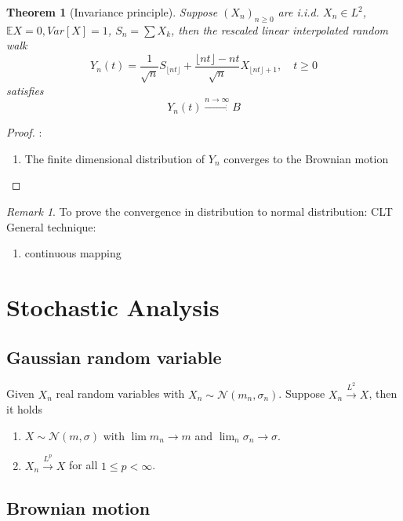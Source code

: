 \documentclass[a4paper,11pt]{book}
\newtheorem{theorem}{Theorem}[section]
\theoremstyle{definition}
\theoremstyle{remark}
\newtheorem*{remark}{Remark}
\begin{document}
\begin{theorem}[Invariance principle]
	Suppose $(X_n)_{n \geq 0}$ are i.i.d. $X_n \in L^2$, $\mathbb{E}X = 0, Var[X] = 1$, $S_n = \sum X_k$, then the rescaled linear interpolated random walk 
	\begin{equation*}
		Y_n(t) = \frac{1}{\sqrt{n}} S_{\lfloor nt \rfloor} + \frac{\lfloor nt \rfloor - nt}{\sqrt{n}} X_{\lfloor nt \rfloor + 1}, \quad t \geq 0
	\end{equation*}
	satisfies 
	\begin{equation*}
		Y_n(t) \overset{n \rightarrow \infty}{\rightarrow} B
	\end{equation*}
\end{theorem}
\begin{proof}:
	\begin{enumerate}
		\item The finite dimensional distribution of $Y_n$ converges to the Brownian motion
	\end{enumerate}
\end{proof}
\begin{remark}
To prove the convergence in distribution to normal distribution: CLT\\
General technique: 
\begin{enumerate}
	\item continuous mapping
\end{enumerate}
\end{remark}


\chapter{Stochastic Analysis}
\section{Gaussian random variable}
Given $X_n$ real random variables with $X_n \sim \mathcal{N}(m_n, \sigma_n)$. Suppose $X_n \overset{L^2}{\longrightarrow} X$, then it holds
\begin{enumerate}
	\item $X \sim \mathcal{N}(m, \sigma)$ with $\lim m_n \rightarrow m$ and $\lim_n \sigma_n \rightarrow \sigma$.
	\item $X_n \overset{L^p}{\rightarrow} X$ for all $1 \le p < \infty$. 
\end{enumerate}



\section{Brownian motion}
\end{document}
